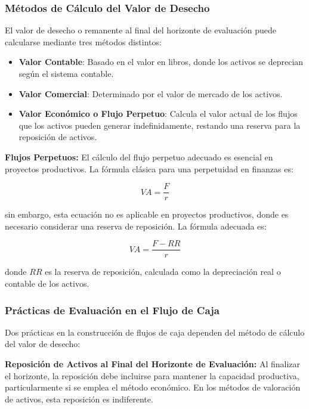 \documentclass{templateNote}
\begin{document}
\subsubsection*{Métodos de Cálculo del Valor de Desecho}
El valor de desecho o remanente al final del horizonte de evaluación puede calcularse mediante tres métodos distintos:

\begin{itemize}
    \item \textbf{Valor Contable}: Basado en el valor en libros, donde los activos se deprecian según el sistema contable.
    \item \textbf{Valor Comercial}: Determinado por el valor de mercado de los activos.
    \item \textbf{Valor Económico o Flujo Perpetuo}: Calcula el valor actual de los flujos que los activos pueden generar indefinidamente, restando una reserva para la reposición de activos.
\end{itemize}

\textbf{Flujos Perpetuos:}
El cálculo del flujo perpetuo adecuado es esencial en proyectos productivos. La fórmula clásica para una perpetuidad en finanzas es:

\begin{equation}
    VA = \frac{F}{r}
\end{equation}

sin embargo, esta ecuación no es aplicable en proyectos productivos, donde es necesario considerar una reserva de reposición. La fórmula adecuada es:

\begin{equation}
    VA = \frac{F - RR}{r}
\end{equation}

donde $RR$ es la reserva de reposición, calculada como la depreciación real o contable de los activos.

\subsubsection*{Prácticas de Evaluación en el Flujo de Caja}
Dos prácticas en la construcción de flujos de caja dependen del método de cálculo del valor de desecho:

\textbf{Reposición de Activos al Final del Horizonte de Evaluación:}
Al finalizar el horizonte, la reposición debe incluirse para mantener la capacidad productiva, particularmente si se emplea el método económico. En los métodos de valoración de activos, esta reposición es indiferente.
\end{document}
